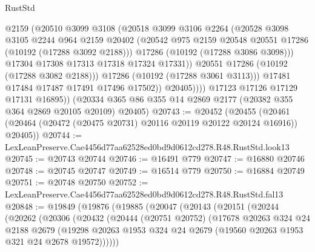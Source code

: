 \begin{lexlean}{RustStd}
\begin{coremodule}
                        @2159
                        (@20510
                          @3099
                          @3108
                          (@20518
                            @3099
                            @3106
                            @2264
                            (@20528
                              @3098
                              @3105
                              @2244
                              @964
                              @2159
                              @20402
                              (@20542 @975 @2159 @20548 @20551 @17286 (@10192 (@17288 @3092 @2188)))
                              @17286
                              (@10192 (@17288 @3086 @3098)))
                            @17304
                            @17308
                            @17313
                            @17318
                            @17324
                            @17331))
                        @20551
                        @17286
                        (@10192 (@17288 @3082 @2188)))
                      @17286
                      (@10192 (@17288 @3061 @3113)))
                    @17481
                    @17484
                    @17487
                    @17491
                    @17496
                    @17502))
                @20405))))
        @17123
        @17126
        @17129
        @17131
        @16895))
    (@20334 @365 @86 @355 @14 @2869 @2177 (@20382 @355 @364 @2869 @20105 @20109) @20405)
@20743 := @20452
    (@20455 (@20461 (@20464 (@20472 (@20475 @20731) @20116 @20119 @20122 @20124 @16916)) @20405))
@20744 := LexLeanPreserve.Cae4456d77aa62528ed0bd9d0612cd278.R48.RustStd.look13
@20745 := @20743 @20744
@20746 := @16491 @779
@20747 := @16880 @20746
@20748 := @20745 @20747
@20749 := @16514 @779
@20750 := @16884 @20749
@20751 := @20748 @20750
@20752 := LexLeanPreserve.Cae4456d77aa62528ed0bd9d0612cd278.R48.RustStd.fal13
@20848 := @19849
    (@19876
      (@19885
        (@20047
          (@20143
            (@20151
              (@20244
                (@20262
                  (@20306
                    (@20432
                      (@20444
                        (@20751 @20752)
                        (@17678
                          @20263
                          @324
                          @24
                          @2188
                          @2679
                          (@19298
                            @20263
                            @1953
                            @324
                            @24
                            @2679
                            (@19560 @20263 @1953 @321 @24 @2678 @19572))))))

\end{coremodule}
\end{lexlean}
